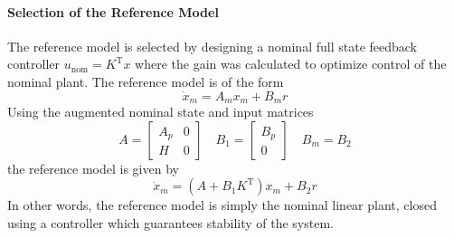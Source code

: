 \paragraph{Selection of the Reference Model}
The reference model is selected by designing a nominal full state feedback controller $u_{\text{nom}}=K^{\text{T}}x$ where the gain was calculated to optimize control of the nominal plant.
The reference model is of the form
\begin{equation}\label{eqn.adaptive.xdotm_cl_eqn}
  \dot{x}_{m}=A_{m}x_{m}+B_{m}r
\end{equation}
Using the augmented nominal state and input matrices
\begin{equation}\label{adaptive.label_eqn_3}
  A=
  \begin{bmatrix}
    A_{p} & 0 \\
    H & 0
  \end{bmatrix} \quad
  B_{1}=
  \begin{bmatrix}
    B_{p} \\
    0
  \end{bmatrix} \quad
  B_{m}=B_{2}
\end{equation}
the reference model is given by
\begin{equation}\label{xdotm2_cl_eqn}
  \dot{x}_{m}=(A+B_{1}K^{\text{T}})x_{m}+B_{2}r
\end{equation}
In other words, the reference model is simply the nominal linear plant, closed using a controller which guarantees stability of the system.

